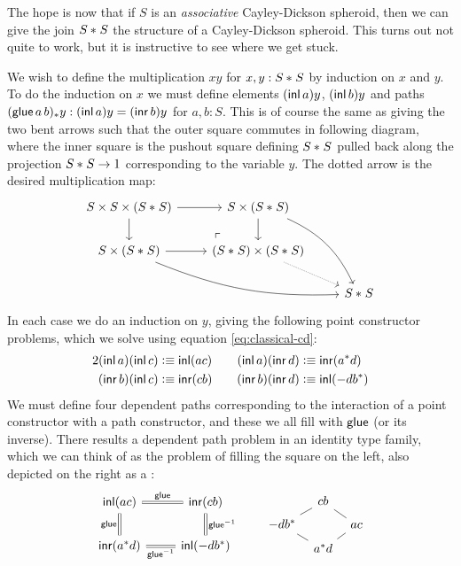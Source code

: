 The hope is now that if $S$ is an \emph{associative} Cayley-Dickson spheroid, then we can give the
join ${S}\ast_{}{S}$ the structure of a Cayley-Dickson spheroid. This turns out not quite to work, but it is instructive
to see where we get stuck.

We wish to define the multiplication $xy$ for $x,y : {S}\ast_{}{S}$ by
induction on $x$ and $y$. To do the induction on $x$ we must define
elements $({\mathsf{inl}}\, a)y$, $({\mathsf{inl}}\, b)y$ and paths
$({\mathsf{glue}}\,a\,b)_*y : ({\mathsf{inl}}\, a)y = ({\mathsf{inr}}\, b)y$ for
$a,b:S$. This is of course the same as giving the two bent arrows such
that the outer square commutes in following diagram, where the inner square
is the pushout square defining ${S}\ast_{}{S}$ pulled back along the
projection ${S}\ast_{}{S} \to 1$ corresponding to the variable $y$. The
dotted arrow is the desired multiplication map:
\begin{equation*}
\begin{tikzcd}
S\times S\times(\join{S}{S}) \arrow{r} \arrow{d}
\arrow[dr,phantom,"\ulcorner",very near end] &
S\times(\join{S}{S}) \arrow{d} \arrow[bend left=20]{ddr} \\
S\times(\join{S}{S}) \arrow{r} \arrow[bend right=12]{drr} &
(\join{S}{S})\times(\join{S}{S}) \arrow[densely dotted]{dr} \\
& & \join{S}{S}
\end{tikzcd}
\end{equation*}
In each case we do an induction on $y$, giving the following point
constructor problems, which we solve using equation
\eqref{eq:classical-cd}:
\begin{alignat*}2
  (\inl\, a)(\inl\, c) &\defeq \inl(ac) &\quad
  (\inl\, a)(\inr\, d) &\defeq \inr(a^*d) \\
  (\inr\, b)(\inl\, c) &\defeq \inr(cb) &\quad
  (\inr\, b)(\inr\, d) &\defeq \inl(-db^*)
\end{alignat*}
We must define four dependent paths corresponding to the interaction
of a point constructor with a path constructor, and these we all fill
with ${\mathsf{glue}}$ (or its inverse). There results a dependent path problem
in an identity type family, which we can think of as the problem of
filling the square on the left, also depicted on the right as a
:
\begin{equation}\label{eq:cd-diamond}
  \begin{tikzcd}[arrows=equals]
    \inl(ac) \arrow{r}{\jglue}\arrow{d}[swap]{\jglue} &
    \inr(cb) \arrow{d}{\rev{\jglue}} \\
    \inr(a^*d) \arrow{r}[swap]{\rev{\jglue}} &
    \inl(-db^*)
  \end{tikzcd}
  \qquad
  \begin{tikzcd}[every arrow/.append style={-},row sep=tiny,column sep=tiny]
    & cb \arrow{dl}\arrow{dr} & \\
    -db^* \arrow{dr} & & ac\arrow{dl} \\
    & a^*d &
  \end{tikzcd}
\end{equation}
